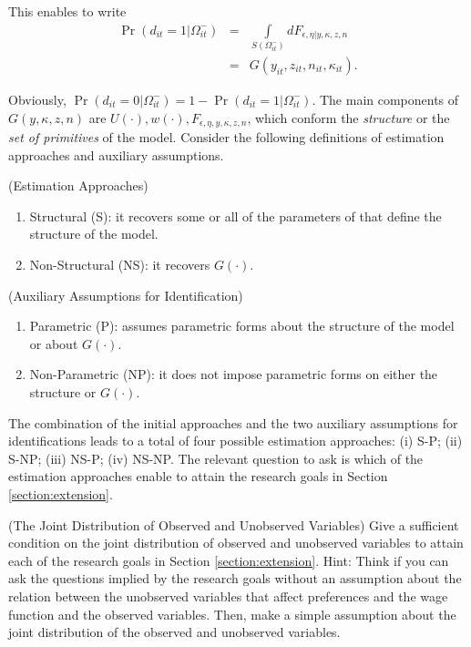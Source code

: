 \indent This enables to write
\begin{eqnarray}
\Pr \left( d_{it} = 1 | \Omega_{it}^{-} \right) &=& \int \limits _{S \left(  \Omega_{it}^- \right)} d F _{\epsilon, \eta |  y, \kappa, z, n} \nonumber \\
&=& G \left( y_{it}, z_{it}, n_{it}, \kappa_{it} \right).
\end{eqnarray}

\noindent Obviously, $\Pr \left( d_{it} = 0 | \Omega_{it}^- \right) = 1 - \Pr \left( d_{it} = 1 | \Omega_{it}^- \right)$. The main components of $G \left( y, \kappa, z, n \right)$ are $U(\cdot), w(\cdot), F _{\epsilon, \eta,  y, \kappa, z, n}$, which conform the \emph{structure} or the \emph{set of primitives} of the model. Consider the following definitions of estimation approaches and auxiliary assumptions.

\begin{definition} (Estimation Approaches) \label{definition:ea}
\begin{enumerate}
\item Structural (S): it recovers some or all of the parameters of that define the structure of the model.
\item Non-Structural (NS): it recovers $G(\cdot)$.
\end{enumerate}
\end{definition}

\begin{definition} (Auxiliary Assumptions for Identification) \label{definition:aa}
\begin{enumerate}
\item Parametric (P): assumes parametric forms about the structure of the model or about $G(\cdot)$.
\item Non-Parametric (NP): it does not impose parametric forms on either the structure or $G(\cdot)$.
\end{enumerate}
\end{definition}

\indent The combination of the initial approaches and the two auxiliary assumptions for identifications leads to a total of four possible estimation approaches: (i) S-P; (ii) S-NP; (iii) NS-P; (iv) NS-NP. The relevant question to ask is which of the estimation approaches enable to attain the research goals in Section \ref{section:extension}.

\begin{exercise} (The Joint Distribution of Observed and Unobserved Variables)
Give a sufficient condition on the joint distribution of observed and unobserved variables to attain each of the research goals in Section \ref{section:extension}. Hint: Think if you can ask the questions implied by the research goals without an assumption about the relation between the unobserved variables that affect preferences and the wage function and the observed variables. Then, make a simple assumption about the joint distribution of the observed and unobserved variables.
\end{exercise}

